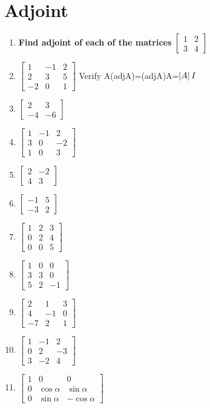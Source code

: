 \documentclass[journal,12pt,twocolumn]{IEEEtran}
\renewcommand\thesection{\arabic{section}}
\begin{document}
\section{Adjoint}
\renewcommand{\theequation}{\theenumi}
\begin{enumerate}[label=\thesection.\arabic*.,ref=\thesection.\theenumi]
\item \textbf{Find adjoint of each of the matrices} $\begin{bmatrix}
1&2 \\ 3&4
\end{bmatrix}$
\item $\begin{bmatrix}
1&-1&2 \\ 2&3&5 \\ -2&0&1
\end{bmatrix}$
Verify A(adjA)=(adjA)A=$\left\vert A\right\vert I$
\item $\begin{bmatrix}
2&3 \\ -4&-6
\end{bmatrix}$
\item $\begin{bmatrix}
1&-1&2 \\ 3&0&-2 \\ 1&0&3
\end{bmatrix}$
\item $\begin{bmatrix}
2&-2 \\ 4&3
\end{bmatrix}$
\item $\begin{bmatrix}
-1&5 \\ -3&2
\end{bmatrix}$
\item $\begin{bmatrix}
1&2&3 \\ 0&2&4 \\ 0&0&5
\end{bmatrix}$
\item $\begin{bmatrix}
1&0&0 \\ 3&3&0 \\ 5&2&-1
\end{bmatrix}$
\item $\begin{bmatrix}
2&1&3 \\ 4&-1&0 \\ -7&2&1
\end{bmatrix}$
\item $\begin{bmatrix}
1&-1&2 \\ 0&2&-3 \\ 3&-2&4
\end{bmatrix}$
\item $\begin{bmatrix}
1&0&0 \\ 0& \cos\alpha &\sin\alpha \\ 0&\sin\alpha&-\cos\alpha
\end{bmatrix}$
\end{enumerate}
\end{document}
